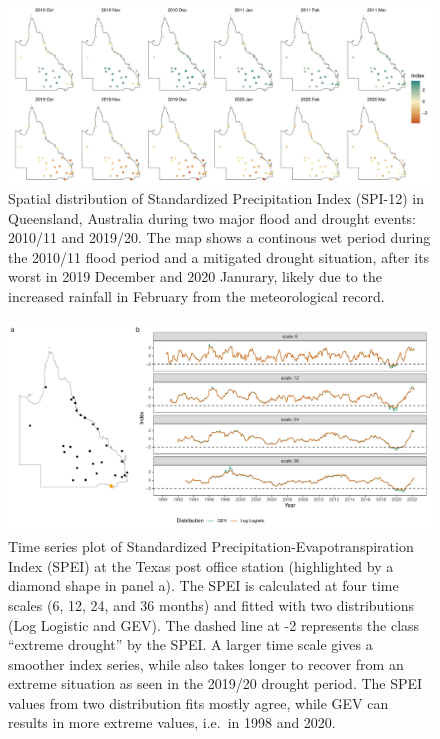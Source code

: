 \documentclass[
]{interact}
\begin{document}
\begin{figure}

{\centering \includegraphics{tidyindex_files/figure-pdf/fig-compute-spatial-1.pdf}

}

\caption{\label{fig-compute-spatial}Spatial distribution of Standardized
Precipitation Index (SPI-12) in Queensland, Australia during two major
flood and drought events: 2010/11 and 2019/20. The map shows a continous
wet period during the 2010/11 flood period and a mitigated drought
situation, after its worst in 2019 December and 2020 Janurary, likely
due to the increased rainfall in February from the meteorological
record.}

\end{figure}

\begin{figure}

{\centering \includegraphics{tidyindex_files/figure-pdf/fig-compute-temporal-1.pdf}

}

\caption{\label{fig-compute-temporal}Time series plot of Standardized
Precipitation-Evapotranspiration Index (SPEI) at the Texas post office
station (highlighted by a diamond shape in panel a). The SPEI is
calculated at four time scales (6, 12, 24, and 36 months) and fitted
with two distributions (Log Logistic and GEV). The dashed line at -2
represents the class ``extreme drought'' by the SPEI. A larger time
scale gives a smoother index series, while also takes longer to recover
from an extreme situation as seen in the 2019/20 drought period. The
SPEI values from two distribution fits mostly agree, while GEV can
results in more extreme values, i.e.~in 1998 and 2020.}

\end{figure}
\end{document}
